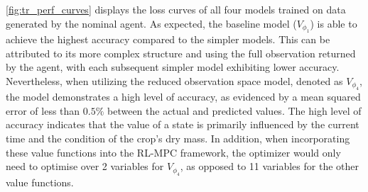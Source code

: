 \autoref{fig:tr_perf_curves} displays the loss curves of all four models trained on data generated by the nominal agent. As expected, the baseline model ($V_{\phi_1}$) is able to achieve the highest accuracy compared to the simpler models. This can be attributed to its more complex structure and using the full observation returned by the agent, with each subsequent simpler model exhibiting lower accuracy. Nevertheless, when utilizing the reduced observation space model, denoted as $V_{\phi_4}$, the model demonstrates a high level of accuracy, as evidenced by a mean squared error of less than $0.5\%$ between the actual and predicted values. The high level of accuracy indicates that the value of a state is primarily influenced by the current time and the condition of the crop's dry mass. In addition, when incorporating these value functions into the RL-MPC framework, the optimizer would only need to optimise over 2 variables for $V_{\phi_4}$, as opposed to 11 variables for the other value functions. 

